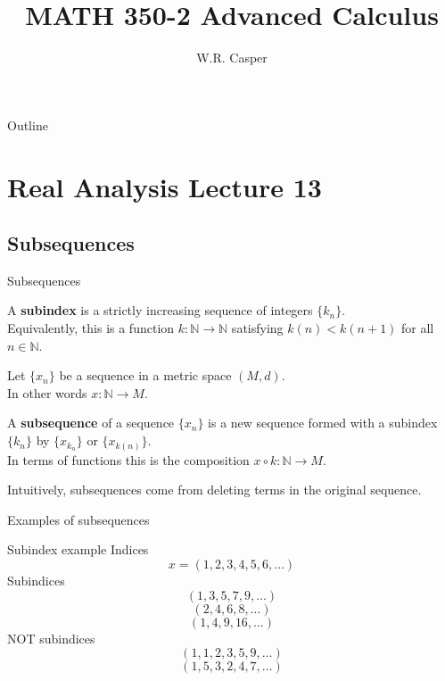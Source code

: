 \documentclass{beamer}
\title{MATH 350-2 Advanced Calculus}
\subtitle
{} %
\author[W.R. Casper] %
{W.R. Casper}
\institute[California State University Fullerton] %
{
  Department of Mathematics\\
  California State University Fullerton}
\begin{document}
\begin{frame}
  \titlepage
\end{frame}

\begin{frame}{Outline}
  \tableofcontents
\end{frame}



\section{Real Analysis Lecture 13}

\subsection{Subsequences}

\begin{frame}{Subsequences}
\pause
\begin{defn}
A \textbf{subindex} is a strictly increasing sequence of integers $\{k_n\}$.\\
\pause
Equivalently, this is a function $k: \mathbb N\rightarrow\mathbb N$ satisfying $k(n)<k(n+1)$ for all $n\in\mathbb N$.
\end{defn}
\pause
Let $\{x_n\}$ be a sequence in a metric space $(M,d)$.\\
\pause
In other words $x: \mathbb N\rightarrow M$.
\pause
\begin{defn}
A \textbf{subsequence} of a sequence $\{x_n\}$ is a new sequence formed with a subindex $\{k_n\}$ by $\{x_{k_n}\}$ or $\{x_{k(n)}\}$.\\
\pause
In terms of functions this is the composition $x\circ k: \mathbb N\rightarrow M$.
\end{defn}
\pause
Intuitively, subsequences come from {\color{red}deleting} terms in the original sequence.
\end{frame}

\begin{frame}{Examples of subsequences}
\begin{block}{Subindex example}
\pause
Indices
$$x = (1, 2, 3, 4, 5, 6,\dots)$$
\pause
Subindices
$$(1,3,5,7,9,\dots)$$
$$(2,4,6,8,\dots)$$
$$(1,4,9,16,\dots)$$
\pause
NOT subindices
$$(1,1,2,3,5,9,\dots)$$
$$(1,5,3,2,4,7,\dots)$$
\end{block}
\end{frame}
\end{document}
